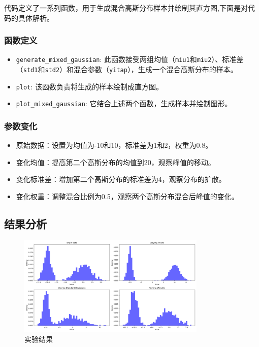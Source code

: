 \documentclass[a4paper]{article}
\begin{document}
代码定义了一系列函数，用于生成混合高斯分布样本并绘制其直方图,下面是对代码的具体解析。


\subsubsection{函数定义}
\begin{itemize}
  \item \texttt{generate\_mixed\_gaussian}: 此函数接受两组均值（\texttt{miu1}和\texttt{miu2}）、标准差（\texttt{std1}和\texttt{std2}）和混合参数（\texttt{yitap}），生成一个混合高斯分布的样本。
  \item \texttt{plot}: 该函数负责将生成的样本绘制成直方图。
  \item \texttt{plot\_mixed\_gaussian}: 它结合上述两个函数，生成样本并绘制图形。
\end{itemize}

\subsubsection{参数变化}
\begin{itemize}
  \item 原始数据：设置为均值为-10和10，标准差为1和2，权重为0.8。
  \item 变化均值：提高第二个高斯分布的均值到20，观察峰值的移动。
  \item 变化标准差：增加第二个高斯分布的标准差为4，观察分布的扩散。
  \item 变化权重：调整混合比例为0.5，观察两个高斯分布混合后峰值的变化。
\end{itemize}

\subsection{结果分析}

\begin{figure}[h]
  \centering
  \includegraphics[width=0.8\textwidth,height=0.3\textwidth]{2.png}
  \caption{实验结果}
  \label{fig:my_label}
\end{figure}
\end{document}
